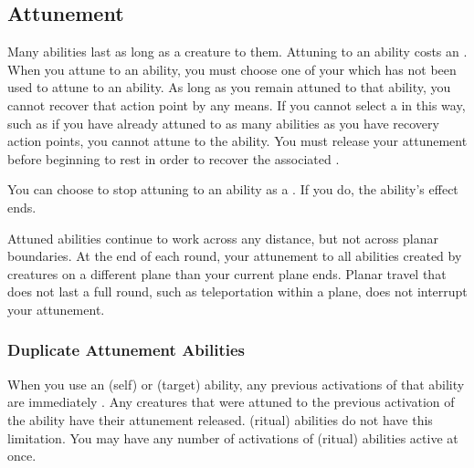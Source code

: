         \subsection{Attunement}\label{Attunement}
            Many abilities last as long as a creature  to them.
            Attuning to an ability costs an .
            When you attune to an ability, you must choose one of your  which has not been used to attune to an ability.
            As long as you remain attuned to that ability, you cannot recover that action point by any means.
            If you cannot select a  in this way,
                such as if you have already attuned to as many abilities as you have recovery action points,
                you cannot attune to the ability.
            You must release your attunement before beginning to rest in order to recover the associated .

            You can choose to stop attuning to an ability as a .
            If you do, the ability's effect ends.

            Attuned abilities continue to work across any distance, but not across planar boundaries.
            At the end of each round, your attunement to all abilities created by creatures on a different plane than your current plane ends.
            Planar travel that does not last a full round, such as teleportation within a plane, does not interrupt your attunement.

            \subsubsection{Duplicate Attunement Abilities}\label{Duplicate Attunement Abilities}
                When you use an  (self) or  (target) ability, any previous activations of that ability are immediately .
                Any creatures that were attuned to the previous activation of the ability have their attunement released.
                 (ritual) abilities do not have this limitation.
                You may have any number of activations of  (ritual) abilities active at once.

